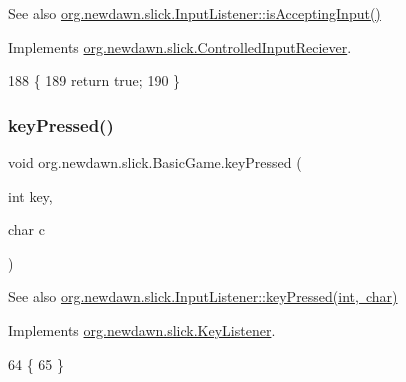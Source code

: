 \begin{DoxySeeAlso}{See also}
\mbox{\hyperlink{interfaceorg_1_1newdawn_1_1slick_1_1_controlled_input_reciever_a380186fb0c34c11c212b72fae8186dc7}{org.\+newdawn.\+slick.\+Input\+Listener\+::is\+Accepting\+Input()}} 
\end{DoxySeeAlso}


Implements \mbox{\hyperlink{interfaceorg_1_1newdawn_1_1slick_1_1_controlled_input_reciever_a380186fb0c34c11c212b72fae8186dc7}{org.\+newdawn.\+slick.\+Controlled\+Input\+Reciever}}.


\begin{DoxyCode}
188                                       \{
189         \textcolor{keywordflow}{return} \textcolor{keyword}{true};
190     \}
\end{DoxyCode}
\mbox{\label{classorg_1_1newdawn_1_1slick_1_1_basic_game_a4fbb3345b5abf5ddd54a99466d07f02f}} 
\subsubsection{\texorpdfstring{key\+Pressed()}{keyPressed()}}
{\footnotesize\ttfamily void org.\+newdawn.\+slick.\+Basic\+Game.\+key\+Pressed (\begin{DoxyParamCaption}\item[{int}]{key,  }\item[{char}]{c }\end{DoxyParamCaption})\hspace{0.3cm}{\ttfamily [inline]}}

\begin{DoxySeeAlso}{See also}
\mbox{\hyperlink{interfaceorg_1_1newdawn_1_1slick_1_1_key_listener_ac0b0568a21ef486c4f51382614c196ef}{org.\+newdawn.\+slick.\+Input\+Listener\+::key\+Pressed(int, char)}} 
\end{DoxySeeAlso}


Implements \mbox{\hyperlink{interfaceorg_1_1newdawn_1_1slick_1_1_key_listener_ac0b0568a21ef486c4f51382614c196ef}{org.\+newdawn.\+slick.\+Key\+Listener}}.


\begin{DoxyCode}
64                                             \{
65     \}
\end{DoxyCode}
\mbox{\label{classorg_1_1newdawn_1_1slick_1_1_basic_game_ae8ce436f93206f0b251a0fbf2a345849}} 
